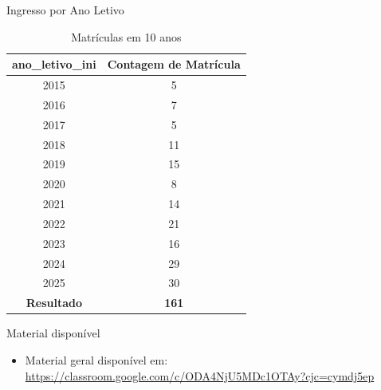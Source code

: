 \begin{frame}{Ingresso por Ano Letivo}
	\centering
	\renewcommand{\arraystretch}{1.3}
	\setlength{\tabcolsep}{10pt}
	\scriptsize 
	\begin{table}[h!]
		\centering
		\caption{\small Matrículas em 10 anos}
		\begin{tabular}{c|c}
			\hline
			\textbf{ano\_letivo\_ini} & \textbf{Contagem de Matrícula} \\
			\hline
			2015 & 5 \\
			2016 & 7 \\
			2017 & 5 \\
			2018 & 11 \\
			2019 & 15 \\
			2020 & 8 \\
			2021 & 14 \\
			2022 & 21 \\
			2023 & 16 \\
			2024 & 29 \\
			2025 & 30 \\
			\hline
			\textbf{Resultado} & \textbf{161} \\
			\hline
		\end{tabular}
	\end{table}
\end{frame}



\begin{frame}{Material disponível}
\begin{itemize}
	\item Material geral disponível em: \url{https://classroom.google.com/c/ODA4NjU5MDc1OTAy?cjc=cymdj5ep}
\end{itemize}

\end{frame}


